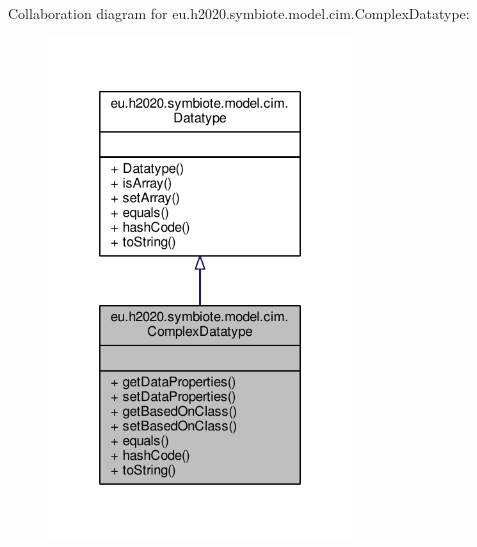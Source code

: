 Collaboration diagram for eu.\+h2020.\+symbiote.\+model.\+cim.\+Complex\+Datatype\+:\nopagebreak
\begin{figure}[H]
\begin{center}
\leavevmode
\includegraphics[width=228pt]{classeu_1_1h2020_1_1symbiote_1_1model_1_1cim_1_1ComplexDatatype__coll__graph}
\end{center}
\end{figure}
